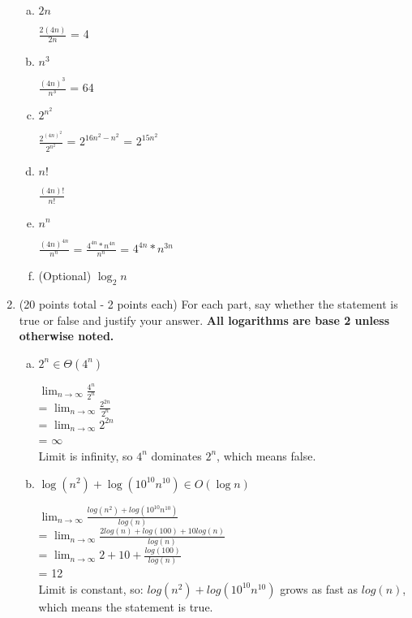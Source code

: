 \documentclass[11pt,letterpaper,unboxed,cm]{hmcpset}
\begin{document}
\begin{enumerate}
\begin{enumerate}[(a)]
\item  $2n$

\bigskip
$\frac{2(4n)}{2n}$ = 4
\bigskip

\item $n^3$

\bigskip
$\frac{(4n)^{3}}{n^3}$ = 64
\bigskip

\item  $2^{n^2}$

\bigskip
$\frac{2^{(4n)^2}}{2^{n^2}}$
= $2^{16n^2 - n^2}$
= $2^{15n^2}$
\bigskip

\item  $n!$

\bigskip
$\frac{(4n)!}{n!}$
\bigskip

\item  $n^n$

\bigskip
$\frac{(4n)^{4n}}{n^n}$
= $\frac{4^{4n}*n^{4n}}{n^n}$
= $4^{4n}*n^{3n}$
\bigskip

\item (Optional) $\log_2 n$

\end{enumerate}



\bigskip
\item (20 points total - 2 points each) For each part, say whether the statement is true or false and justify your answer. \textbf{All logarithms are base 2 unless otherwise noted.}

\bigskip

\begin{enumerate}[(a)]
\item  $\displaystyle 2^n \in \Theta(4^n)$

\bigskip
$\lim_{n\to\infty} \frac{4^n}{2^n}$ \\
 = $\lim_{n\to\infty} \frac{2^{2n}}{2^n}$ \\
 = $\lim_{n\to\infty} 2^{2n}$ \\
 = $\infty$ \\
 Limit is infinity, so ${4^n}$ dominates ${2^n}$, which means false.
\bigskip

\item  $\displaystyle \log(n^2)+\log(10^{10} n^{10}) \in O(\log n)$

\bigskip
$\lim_{n\to\infty} \frac{log(n^2) + log(10^{10}n^{10})}{log(n)}$ \\
 = $\lim_{n\to\infty} \frac{2log(n) + log(100) + 10log(n)}{log(n)}$ \\
 = $\lim_{n\to\infty} 2 + 10 + \frac{log(100)}{log(n)}$ \\
 = 12 \\
 Limit is constant, so:
 $log(n^2) + log(10^{10}n^{10})$ grows as fast as ${log(n)}$, which means the statement is true.
\bigskip


\end{enumerate}
\end{enumerate}
\end{document}
